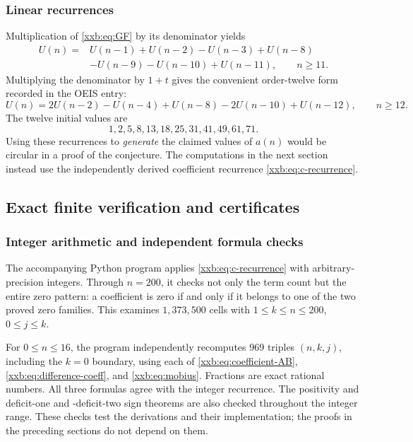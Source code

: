 \documentclass[11pt,a4paper]{article}
\numberwithin{equation}{section}
\theoremstyle{definition}
\theoremstyle{remark}
\theoremstyle{plain}
\newcommand{\U}{U}
\begin{document}
\subsubsection{Linear recurrences}
Multiplication of \eqref{xxb:eq:GF} by its denominator yields
\begin{equation}\label{xxb:eq:rec11}
 \begin{split}
 \U(n)={}&\U(n-1)+\U(n-2)-\U(n-3)+\U(n-8)\\
         &-\U(n-9)-\U(n-10)+\U(n-11),\qquad n\ge11.
 \end{split}
\end{equation}
Multiplying the denominator by $1+t$ gives the convenient order-twelve
form recorded in the OEIS entry:
\begin{equation}\label{xxb:eq:rec12}
 \U(n)=2\U(n-2)-\U(n-4)+\U(n-8)-2\U(n-10)+\U(n-12),
 \qquad n\ge12.
\end{equation}
The twelve initial values are
\[
 1,2,5,8,13,18,25,31,41,49,61,71.
\]
Using these recurrences to \emph{generate} the claimed values of $a(n)$
would be circular in a proof of the conjecture. The computations in the
next section instead use the independently derived coefficient recurrence
\eqref{xxb:eq:c-recurrence}.

\subsection{Exact finite verification and certificates}\label{xxb:sec:computation}
\subsubsection{Integer arithmetic and independent formula checks}
The accompanying Python program applies \eqref{xxb:eq:c-recurrence} with
arbitrary-precision integers. Through $n=200$, it checks not only the
term count but the entire zero pattern: a coefficient is zero if and only
if it belongs to one of the two proved zero families. This examines
$1{,}373{,}500$ cells with $1\le k\le n\le200$, $0\le j\le k$.

For $0\le n\le16$, the program independently recomputes $969$ triples
$(n,k,j)$, including the $k=0$ boundary, using each of
\eqref{xxb:eq:coefficient-AB}, \eqref{xxb:eq:difference-coeff}, and
\eqref{xxb:eq:mobius}. Fractions are exact rational numbers. All three formulas
agree with the integer recurrence. The positivity and deficit-one and
-deficit-two sign theorems are also checked throughout the integer range.
These checks test the derivations and their implementation; the proofs in
the preceding sections do not depend on them.
\end{document}
